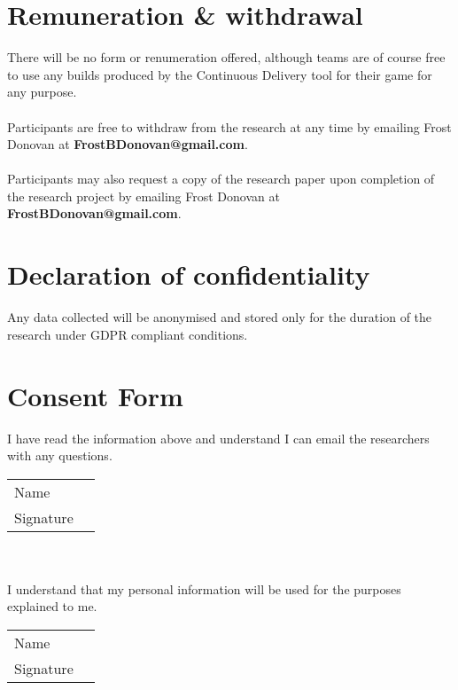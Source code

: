 \documentclass{article}
\begin{document}
        \newpage

    \section{Remuneration \& withdrawal}
        There will be no form or renumeration offered, although teams are of course free to use any builds produced by the Continuous Delivery tool for their game for any purpose.
        \\ \\
        Participants are free to withdraw from the research at any time by emailing Frost Donovan at \textbf{FrostBDonovan@gmail.com}. 
        \\ \\
        Participants may also request a copy of the research paper upon completion of the research project by emailing Frost Donovan at \textbf{FrostBDonovan@gmail.com}.
        
    \section{Declaration of confidentiality}
        Any data collected will be anonymised and stored only for the duration of the research under GDPR compliant conditions.

    \newpage

    \section{Consent Form}
        I have read the information above and understand I can email the researchers with any questions. \\

        \begin{tabular}{@{}p{.5in}p{3.5in}@{}}
            Name & \hrulefill \\
            Signature & \hrulefill \\
        \end{tabular} \\
        \\

        I understand that my personal information will be used for the purposes explained to me. \\

        \begin{tabular}{@{}p{.5in}p{3.5in}@{}}
            Name & \hrulefill \\
            Signature & \hrulefill \\
        \end{tabular} \\
        \\
\end{document}
